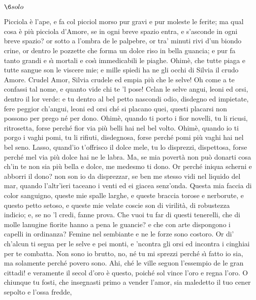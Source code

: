 \documentclass{book}
\begin{document}
\Atto

\Scena

\(\6 solo\)

	\6 Picciola \`e l'ape, e fa col picciol morso
	pur gravi e pur moleste le ferite;
	ma qual cosa \`e pi\`u picciola d'Amore,
	se in ogni breve spazio entra, e s'asconde
	in ogni breve spazio? or sotto a l'ombra
	de le palpebre, or tra' minuti rivi
	d'un biondo crine, or dentro le pozzette
	che forma un dolce riso in bella guancia;
	e pur fa tanto grandi e s\`{\i} mortali
	e cos\`{\i} immedicabili le piaghe.
	Ohim\`e, che tutte piaga e tutte sangue
	son le viscere mie; e mille spiedi
	ha ne gli occhi di Silvia il crudo Amore.
	Crudel Amor, Silvia crudele ed empia
	pi\`u che le selve! Oh come a te confassi
	tal nome, e quanto vide chi te 'l pose!
	Celan le selve angui, leoni ed orsi,
	dentro il lor verde: e tu dentro al bel petto
	nascondi odio, disdegno ed impietate,
	fere peggior ch'angui, leoni ed orsi
	ch\'e si placano quei, questi placarsi
	non possono per prego n\'e per dono.
	Ohim\`e, quando ti porto i fior novelli,
	tu li ricusi, ritrosetta, forse
	perch\'e fior via pi\`u belli hai nel bel volto.
	Ohim\`e, quando io ti porgo i vaghi pomi,
	tu li rifiuti, disdegnosa, forse
	perch\'e pomi pi\`u vaghi hai nel bel seno.
	Lasso, quand'io t'offrisco il dolce mele,
	tu lo disprezzi, dispettosa, forse
	perch\'e mel via pi\`u dolce hai ne le labra.
	Ma, se mia povert\`a non pu\`o donarti
	cosa ch'in te non sia pi\`u bella e dolce,
	me medesmo ti dono. Or perch\'e iniqua
	scherni e abborri il dono? non son io
	da disprezzar, se ben me stesso vidi
	nel liquido del mar, quando l'altr'ieri
	taceano i venti ed ei giacea senz'onda.
	Questa mia faccia di color sanguigno,
	queste mie spalle larghe, e queste braccia
	torose e nerborute, e questo petto
	setoso, e queste mie velate coscie
	son di virilit\`a, di robustezza
	indicio; e, se no 'l credi, fanne prova.
	Che vuoi tu far di questi tenerelli,
	che di molle lanugine fiorite
	hanno a pena le guancie? e che con arte
	dispongono i capelli in ordinanza?
	Femine nel sembiante e ne le forze
	sono costoro. Or di' ch'alcun ti segua
	per le selve e pei monti, e 'ncontra gli orsi
	ed incontra i cinghiai per te combatta.
	Non sono io brutto, no, n\'e tu mi sprezzi
	perch\'e s\`{\i} fatto io sia, ma solamente
	perch\'e povero sono. Ahi, ch\'e le ville
	seguon l'essempio de le gran cittadi!
	e veramente il secol d'oro \`e questo,
	poich\'e sol vince l'oro e regna l'oro.
	O chiunque tu fosti, che insegnasti
	primo a vender l'amor, sia maledetto
	il tuo cener sepolto e l'ossa fredde,
\end{document}
